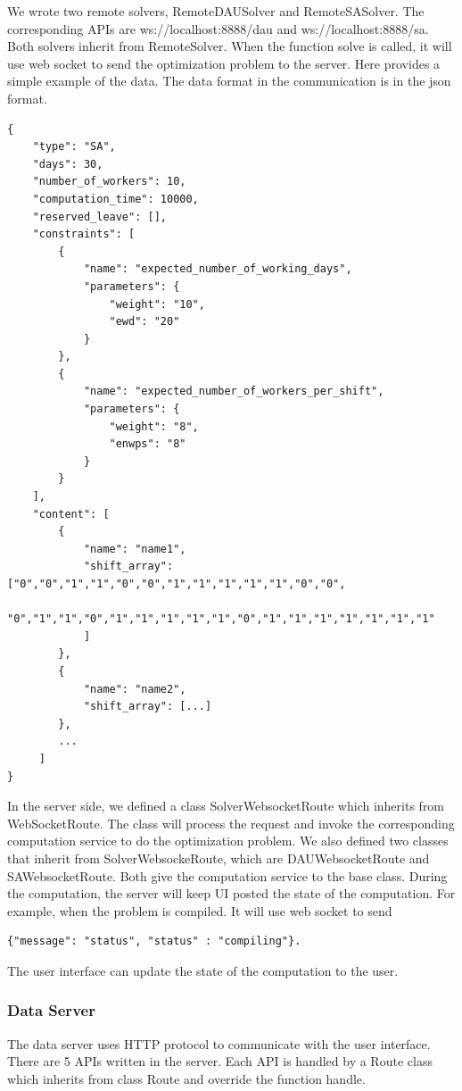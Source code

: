 \documentclass[11pt, oneside]{article}   	%
\begin{document}
We wrote two remote solvers, RemoteDAUSolver and RemoteSASolver. The corresponding APIs are ws://localhost:8888/dau and ws://localhost:8888/sa. Both solvers inherit from RemoteSolver.
When the function solve is called, it will use web socket to send the optimization problem to the server. Here provides a simple example of the data.
The data format in the communication is in the json format.
\begin{verbatim}
{
    "type": "SA",
    "days": 30,
    "number_of_workers": 10,
    "computation_time": 10000,
    "reserved_leave": [],
    "constraints": [
        {
            "name": "expected_number_of_working_days",
            "parameters": {
                "weight": "10",
                "ewd": "20"
            }
        },
        {
            "name": "expected_number_of_workers_per_shift",
            "parameters": {
                "weight": "8",
                "enwps": "8"
            }
        }
    ],
    "content": [
        {
            "name": "name1",
            "shift_array": ["0","0","1","1","0","0","1","1","1","1","1","0","0",
            "0","1","1","0","1","1","1","1","1","0","1","1","1","1","1","1","1"
            ]
        },
        {
            "name": "name2",
            "shift_array": [...]
        },
        ...
     ]
}

\end{verbatim}
In the server side, we defined a class SolverWebsocketRoute which inherits from WebSocketRoute. 
The class will process the request and invoke the corresponding computation service to do the optimization problem.
We also defined two classes that inherit from SolverWebsockeRoute, which are DAUWebsocketRoute and SAWebsocketRoute.
Both give the computation service to the base class.
During the computation, the server will keep UI posted the state of the computation. For example, when the problem is compiled. It will use web socket to send
\begin{verbatim}
{"message": "status", "status" : "compiling"}.
\end{verbatim}
The user interface can update the state of the computation to the user.

\subsubsection{Data Server}
The data server uses HTTP protocol to communicate with the user interface. 
There are 5 APIs written in the server. 
Each API is handled by a Route class which inherits from class Route and override the function handle.
\end{document}
